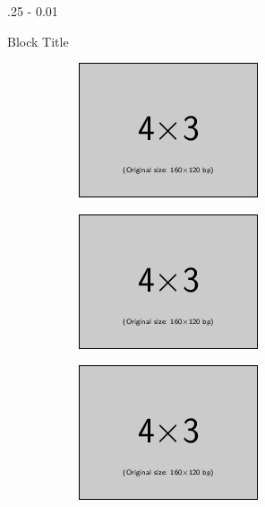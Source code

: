 \documentclass{postertheme}\usepackage[]{graphicx}\usepackage[]{color}
\begin{document}
\begin{frame}
\begin{columns}[onlytextwidth]
\begin{column}{.25 \textwidth - 0.01 \textwidth}
\begin{block}{Block Title}
\begin{figure}
      \begin{minipage}{\linewidth}
        \begin{minipage}{0.49 \linewidth}
          \begin{figure}
            \includegraphics[scale=1]{figures/example-image-4x3.jpg}
          \end{figure}
        \end{minipage}
        \hfill
        \begin{minipage}{0.49 \linewidth}
          \begin{figure}
            \includegraphics[scale=1]{figures/example-image-4x3.jpg}
          \end{figure}
        \end{minipage}
      \end{minipage}
      \vfill
      \begin{minipage}{\linewidth}
        \begin{minipage}{0.49 \linewidth}
          \begin{figure}
            \includegraphics[scale=1]{figures/example-image-4x3.jpg}
          \end{figure}
        \end{minipage}
        \hfill
        \begin{minipage}{0.49 \linewidth}

\end{minipage}
\end{minipage}
\end{figure}
\end{block}
\end{column}
\end{columns}
\end{frame}
\end{document}
